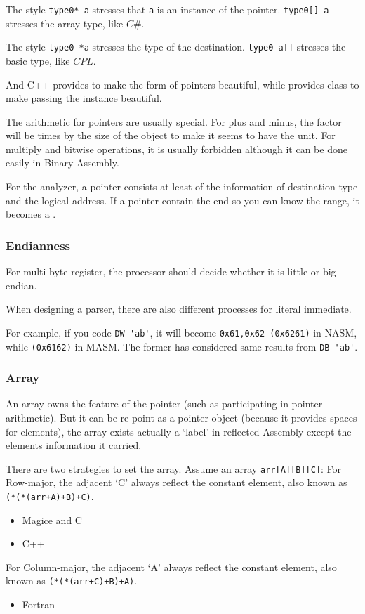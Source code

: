 The style \verb|type0* a| stresses that \verb|a| is an instance of the pointer. \verb|type0[] a| stresses the array type, like $C\#$.

The style \verb|type0 *a| stresses the type of the destination. \verb|type0 a[]| stresses the basic type, like $CPL$.

And C++ provides  to make the form of pointers beautiful, while provides class to make passing the instance beautiful.

The arithmetic for pointers are usually special. For plus and minus, the factor will be times by the size of the object to make it seems to have the unit. For multiply and bitwise operations, it is usually forbidden although it can be done easily in Binary Assembly. 

For the analyzer, a pointer consists at least of the information of destination type and the logical address.
If a pointer contain the end so you can know the range, it becomes a .

\subsubsection{Endianness}

For multi-byte register, the processor should decide whether it is little or big endian.

When designing a parser, there are also different processes for literal immediate.

For example, if you code \verb|DW 'ab'|, it will become \verb"0x61,0x62 (0x6261)" in NASM, while \verb"(0x6162)" in MASM. The former has considered same results from \verb|DB 'ab'|. %

\subsubsection{Array}

An array owns the feature of the pointer (such as participating in pointer-arithmetic). But it can be re-point as a pointer object (because it provides spaces for elements), the array exists actually a `label' in reflected Assembly except the elements information it carried. 

There are two strategies to set the array. Assume an array \verb|arr[A][B][C]|:
For Row-major, the adjacent `C' always reflect the constant element, also known as \verb|(*(*(arr+A)+B)+C)|.
\begin{itemize}
	\item Magice and C
	\item C++
\end{itemize}
For Column-major, the adjacent `A' always reflect the constant element, also known as \verb|(*(*(arr+C)+B)+A)|.
\begin{itemize}
	\item Fortran
\end{itemize}

